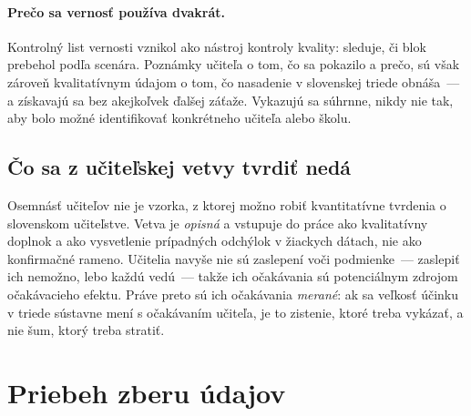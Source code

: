 \paragraph{Prečo sa vernosť používa dvakrát.} Kontrolný list vernosti vznikol ako nástroj kontroly kvality: sleduje, či blok prebehol podľa scenára. Poznámky učiteľa o tom, čo sa pokazilo a prečo, sú však zároveň kvalitatívnym údajom o tom, čo nasadenie v slovenskej triede obnáša~--- a získavajú sa bez akejkoľvek ďalšej záťaže. Vykazujú sa súhrnne, nikdy nie tak, aby bolo možné identifikovať konkrétneho učiteľa alebo školu.

\subsection{Čo sa z učiteľskej vetvy tvrdiť nedá}

Osemnásť učiteľov nie je vzorka, z ktorej možno robiť kvantitatívne tvrdenia o slovenskom učiteľstve. Vetva je \emph{opisná} a vstupuje do práce ako kvalitatívny doplnok a ako vysvetlenie prípadných odchýlok v žiackych dátach, nie ako konfirmačné rameno. Učitelia navyše nie sú zaslepení voči podmienke~--- zaslepiť ich nemožno, lebo každú vedú~--- takže ich očakávania sú potenciálnym zdrojom očakávacieho efektu. Práve preto sú ich očakávania \emph{merané}: ak sa veľkosť účinku v triede sústavne mení s očakávaním učiteľa, je to zistenie, ktoré treba vykázať, a nie šum, ktorý treba stratiť.


\section{Priebeh zberu údajov}
\label{sec:priebeh}

